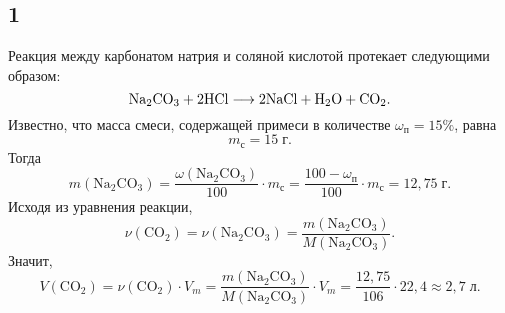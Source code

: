\subsection{1}

Реакция между карбонатом натрия и соляной кислотой протекает следующими образом:
\[
\rm Na_2CO_3+2HCl\longrightarrow2NaCl+H_2O+CO_2.
\]
Известно, что масса смеси, содержащей примеси в количестве $\omega_\text{п}=15\%$, равна
\[
m_\text{с}=15\;\text{г}.
\]
Тогда
\[
m(\mathrm{Na_2CO_3})=\frac{\omega(\mathrm{Na_2CO_3})}{100}\cdot m_\text{с}=\frac{100-\omega_\text{п}}{100}\cdot m_\text{с}=12{,}75\;\text{г}.
\]
Исходя из уравнения реакции,
\[
\nu(\mathrm{CO_2})=\nu(\mathrm{Na_2CO_3})=\frac{m(\mathrm{Na_2CO_3})}{M(\mathrm{Na_2CO_3})}.
\]
Значит,
\[
V(\mathrm{CO_2})=\nu(\mathrm{CO_2})\cdot V_m=\frac{m(\mathrm{Na_2CO_3})}{M(\mathrm{Na_2CO_3})}\cdot V_m=\frac{12{,}75}{106}\cdot22{,}4\approx2{,}7\;\text{л}.
\]